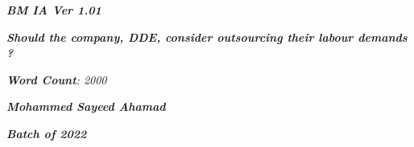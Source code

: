 

\begin{titlepage}
    \begin{center}
        \vspace*{1cm}
            
        \date{}
            
        \huge
            
        \textit{\textbf{BM IA Ver 1.01}}
            
        \vspace{0.25cm}
            
        \hline
            
        \vspace{2.5cm}
            

		\vspace{0.25cm}
            
        \vspace{1cm}
            
            
        \textit{\textbf{Should the company, DDE, consider outsourcing their labour demands ? }}
            
        \vspace{2.5cm}
            
        \Large
            
		\textit{\textbf{Word Count}: 2000}            

		\vspace{2cm}            
            
		\Large		
		            
        \textit{\textbf{Mohammed Sayeed Ahamad}}
            
        \vspace{2cm}
            
        \Large
            
        \textit{\textbf{Batch of 2022}}
            
        \vspace{0.25cm}
            
        \hline
           
            
    \end{center}
\end{titlepage}




